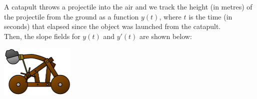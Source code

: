 \newpage

\question
\begin{minipage}{.7\textwidth}
	A catapult throws a projectile into the air and we track the height (in metres) of the projectile from the ground as a function $y(t)$, where $t$ is the time (in seconds) that elapsed since the object was launched from the catapult. \\

	Then, the slope fields for $y(t)$ and $y'(t)$ are shown below:
\end{minipage}\hfill
\begin{minipage}{100pt}
	\includegraphics*[width=100pt]{images/module9-catapult.pdf}	
\end{minipage}






